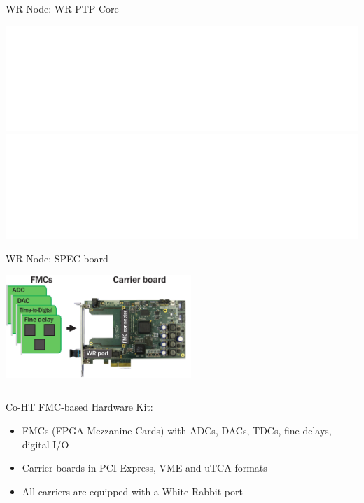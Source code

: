 \documentclass[compress,red]{beamer}
\begin{document}
\begin{frame}{WR Node: WR PTP Core}

    \begin{center}
    \includegraphics<1>[width=1.0\textwidth]{node/wrpc_box.pdf} \pause
    \includegraphics<2>[width=1.0\textwidth]{node/wrpc_inside.pdf}
    \end{center}

\end{frame}
\begin{frame}{WR Node: SPEC board}

    \begin{center}
    \includegraphics[width=7cm]{node/shw_kit-1.pdf}
    \end{center}

  \begin{columns}[c]

	\begin{block}{Co-HT FMC-based Hardware Kit:}
	  \begin{itemize}
	  \item FMCs (FPGA Mezzanine Cards) with ADCs, DACs, TDCs, fine delays, digital I/O
	  \item Carrier boards in PCI-Express, VME and uTCA formats
	  \item All carriers are equipped with a White Rabbit port
	  \end{itemize}
	\end{block}

  \end{columns}


\end{frame}
\end{document}
